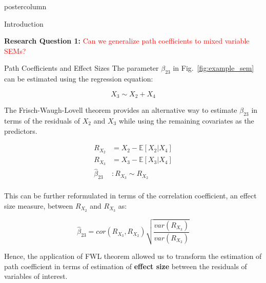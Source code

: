 \documentclass{beamer}
\begin{document}
\begin{frame}
\begin{columns}
\begin{column}{.33\textwidth}
\begin{beamercolorbox}[center]{postercolumn}
\begin{minipage}{.98\textwidth}
{\begin{myblock}{Introduction}
		\vspace{1em}

		\textbf{Research Question 1:} \textcolor{red}{Can we generalize path coefficients to mixed variable SEMs?}
	\end{myblock}\vfill
	\begin{myblock}{Path Coefficients and Effect Sizes}
		The parameter $ \beta_{23} $ in Fig.~\ref{fig:example_sem} can be estimated using the regression equation:
		
		\begin{equation*}
			X_3 \sim X_2 + X_4
		\end{equation*}
	
		The Frisch-Waugh-Lovell theorem \citep{Frisch1933} provides an alternative way to 
		estimate $ \beta_{23} $ in terms of the residuals of $ X_2 $ and $ X_3 $ while using the remaining covariates as the predictors.

		\begin{equation*}
			\begin{split}
				R_{X_2} &= X_2 - \mathbb{E}[X_2 | X_4] \\
				R_{X_3} &= X_3 - \mathbb{E}[X_3 | X_4] \\
				\hat{\beta}_{23} &: R_{X_3} \sim R_{X_2} \\
			\end{split}
		\end{equation*}

		This can be further reformulated in terms of the correlation coefficient, an effect size measure, between $ R_{X_2} $ and $ R_{X_3} $ as:

		\begin{equation*}
			\hat{\beta}_{23} = cor(R_{X_3}, R_{X_2}) \sqrt{\frac{var(R_{X_3})}{var(R_{X_2})}}
		\end{equation*}

		\vspace{1em}
		
		Hence, the application of FWL theorem allowed us to transform
		the estimation of path coefficient in terms of estimation of
		\textbf{effect size} between the residuals of variables of
		interest.
		
	\end{myblock}\vfill
		}\end{minipage}\end{beamercolorbox}
	\end{column}



\end{columns}
\end{frame}
\end{document}
